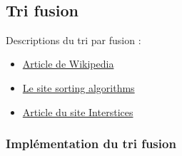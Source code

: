 \documentclass[11pt]{article}
\providecommand{\tightlist}{%
      \setlength{\itemsep}{0pt}\setlength{\parskip}{0pt}}
\begin{document}
    \begin{center}
    \end{center}
    { \hspace*{\fill} \\}
    
    \subsection{Tri fusion}\label{tri-fusion}

    Descriptions du tri par fusion :

\begin{itemize}
\tightlist
\item
  \href{http://fr.wikipedia.org/wiki/Tri_fusion}{Article de Wikipedia}
\item
  \href{http://www.sorting-algorithms.com/merge-sort}{Le site sorting
  algorithms}
\item
  \href{https://interstices.info/jcms/c_6973/les-algorithmes-de-tri}{Article
  du site Interstices}
\end{itemize}

    \subsubsection{Implémentation du tri
fusion}\label{impluxe9mentation-du-tri-fusion}
\end{document}

